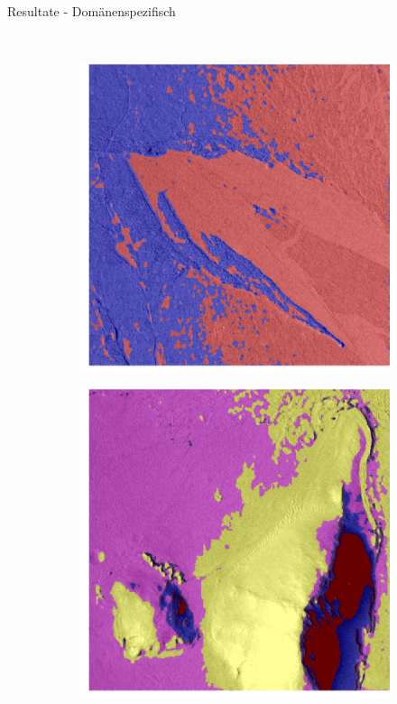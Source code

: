 \documentclass{beamer}
\begin{document}
\begin{frame}[allowframebreaks]{Resultate - Domänenspezifisch}
\begin{figure}[h!]
\begin{subfigure}{0.38\textwidth}
		\end{subfigure}
		\\
		\begin{subfigure}{0.38\textwidth}
			\includegraphics[width=\linewidth,keepaspectratio]{gfx/p03_03.png_3.png}
		\end{subfigure}
		\begin{subfigure}{0.38\textwidth}
			\includegraphics[width=\linewidth,keepaspectratio]{gfx/p03_04.png_3.png}

\end{subfigure}
\end{figure}
\end{frame}
\end{document}
